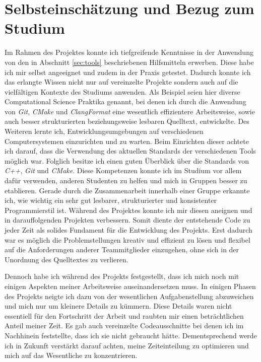 \documentclass[crop=false]{standalone}
\begin{document}
  \section{Selbsteinschätzung und Bezug zum Studium} %
  \label{sec:selbsteinschaetzung}
    Im Rahmen des Projektes konnte ich tiefgreifende Kenntnisse in der Anwendung von den in Abschnitt \ref{sec:tools} beschriebenen Hilfsmitteln erwerben.
    Diese habe ich mir selbst angeeignet und zudem in der Praxis getestet.
    Dadurch konnte ich das erlangte Wissen nicht nur auf vereinzelte Projekte sondern auch auf die vielfältigen Kontexte des Studiums anwenden.
    Als Beispiel seien hier diverse Computational Science Praktika genannt, bei denen ich durch die Anwendung von \textit{Git}, \textit{CMake} und \textit{ClangFormat} eine wesentlich effizientere Arbeitsweise, sowie auch besser strukturierten beziehungsweise lesbaren Quelltext, entwickelte.
    Des Weiteren lernte ich, Entwicklungsumgebungen auf verschiedenen Computersystemen einzurichten und zu warten.
    Beim Einrichten dieser achtete ich darauf, dass die Verwendung des aktuellen Standards der verschiedenen Tools möglich war.
    Folglich besitze ich einen guten Überblick über die Standards von \textit{C++}, \textit{Git} und \textit{CMake}.
    Diese Kompetenzen konnte ich im Studium vor allem dafür verwenden, anderen Studenten zu helfen und mich in Gruppen besser zu etablieren.
    Gerade durch die Zusammenarbeit innerhalb einer Gruppe erkannte ich, wie wichtig ein sehr gut lesbarer, strukturierter und konsistenter Programmierstil ist.
    Während des Projektes konnte ich mir diesen aneignen und in darauffolgenden Projekten verbessern.
    Somit diente der entstehende Code zu jeder Zeit als solides Fundament für die Entwicklung des Projekts.
    Erst dadurch war es möglich die Problemstellungen kreativ und effizient zu lösen und flexibel auf die Anforderungen anderer Teammitglieder einzugehen, ohne sich in der Unordnung des Quelltextes zu verlieren.

    Dennoch habe ich während des Projekts festgestellt, dass ich mich noch mit einigen Aspekten meiner Arbeitsweise auseinandersetzen muss.
    In einigen Phasen des Projekts neigte ich dazu von der wesentlichen Aufgabenstellung abzuweichen und mich nur um kleinere Details zu kümmern.
    Diese Details waren nicht essentiell für den Fortschritt der Arbeit und raubten mir einen beträchtlichen Anteil meiner Zeit.
    Es gab auch vereinzelte Codeausschnitte bei denen ich im Nachhinein feststellte, dass ich sie nicht gebraucht hätte.
    Dementsprechend werde ich in Zukunft verstärkt darauf achten, meine Zeiteinteilung zu optimieren und mich auf das Wesentliche zu konzentrieren.
\end{document}
